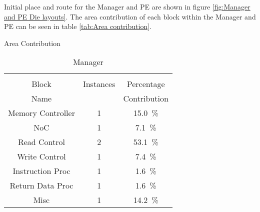 Initial place and route for the Manager and PE are shown in figure \ref{fig:Manager and PE Die layouts}. 
The area contribution of each block within the Manager and PE can be seen in table \ref{tab:Area contribution}.
\begin{table}[h]
  \captionsetup{justification=centering, skip=3pt}
  \caption{Area Contribution}
  \vspace{3pt}
  \label{tab:Area contribution}
  \centering
  \begin{subtable}{0.75\textwidth}
    \centering
    \begin{adjustbox}{width=0.75\textwidth}
      \begin{tabular}{ccc}
        \toprule
                         &          &                                         \\  %
            Block        &Instances &Percentage                               \\  %
            Name         &          &Contribution                             \\  %
        \hline  %
  Memory Controller      & 1&\SI[per-mode=symbol]{15.0}{\percent}  \\ 
        NoC              & 1&\SI[per-mode=symbol]{ 7.1}{\percent}  \\
        Read Control     & 2&\SI[per-mode=symbol]{53.1}{\percent}  \\
        Write Control    & 1&\SI[per-mode=symbol]{ 7.4}{\percent}  \\
      Instruction Proc   & 1&\SI[per-mode=symbol]{ 1.6}{\percent}  \\
      Return Data Proc   & 1&\SI[per-mode=symbol]{ 1.6}{\percent}  \\
        Misc             & 1&\SI[per-mode=symbol]{14.2}{\percent}  \\
        \bottomrule
      \end{tabular}
    \end{adjustbox}
    \vspace{3pt}
    \captionsetup{justification=centering, skip=10pt}
    \caption{Manager}
    \label{tab:Manager Area Contribution}
  \end{subtable}

\end{table}
